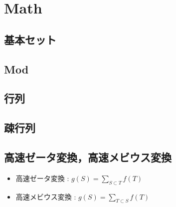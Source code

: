 \section{Math}

\subsection{基本セット}


\subsection{Mod}


\subsection{行列}



\subsection{疎行列}



\subsection{高速ゼータ変換，高速メビウス変換}
\begin{itemize}
  \item 高速ゼータ変換 : $g(S) = \displaystyle\sum_{S \subset T} f(T)$
  \item 高速メビウス変換 : $g(S) = \displaystyle\sum_{T \subset S} f(T)$
\end{itemize}

